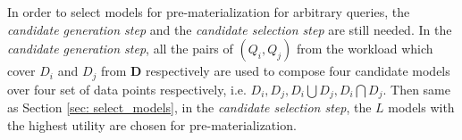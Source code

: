 In order to select models for pre-materialization for arbitrary queries, the {\em candidate generation step} and the {\em candidate selection step} are still needed. In the {\em candidate generation step}, all the pairs of $(Q_i, Q_j)$ from the workload which cover $D_i$ and $D_j$ from $\textbf{D}$ respectively are used to compose four candidate models over four set of data points respectively, i.e. $D_i, D_j, D_i \bigcup D_j, D_i \bigcap D_j$. Then same as Section \ref{sec: select_models}, in the {\em candidate selection step}, the $L$ models with the highest utility are chosen for pre-materialization.